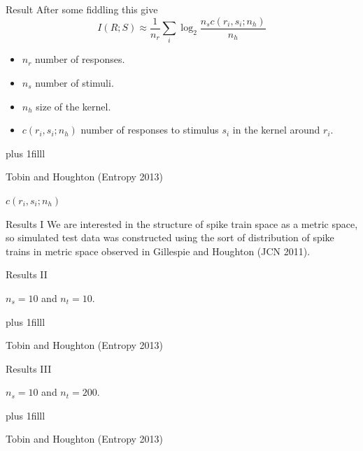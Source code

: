 \documentclass{beamer}
\newcommand{\btVFill}{\vskip0pt plus 1filll}
\begin{document}
\begin{frame}{Result}
After some fiddling this give
\color{dark}
$$
 I(R;S) \approx \frac{1}{n_r}\sum_{i} \log_2{\frac{n_sc(r_i,s_i;n_h)}{n_h}}
$$
\color{black}
\begin{itemize}
\item \color{dark}$n_r$\color{black}{} number of responses.
\item \color{dark}$n_s$\color{black}{} number of stimuli.
\item \color{dark}$n_h$\color{black}{} size of the kernel.
\item \color{dark}$c(r_i,s_i;n_h)$\color{black}{} number of responses to stimulus \color{dark}$s_i$\color{black}{} in the kernel around \color{dark}$r_i$\color{black}.
\end{itemize}
\btVFill
\begin{flushright}
\tiny{Tobin and Houghton (Entropy 2013)}
\end{flushright}
\end{frame}

\begin{frame}{$c(r_i,s_i;n_h)$}
\color{reddish}
\begin{center}

\end{center}
\color{black}
\end{frame}

\begin{frame}{Results I}
We are interested in the structure of spike train space as a metric
space, so simulated test data was constructed using the sort of
distribution of spike trains in metric space observed in Gillespie and
Houghton (JCN 2011).
\end{frame}

\begin{frame}{Results II}
\color{reddish}
\begin{center}

\color{black}
\color{dark} $n_s=10$\color{black}{} and \color{dark}{} $n_t=10$\color{black}.
\end{center}
\color{black}
\btVFill
\begin{flushright}
\tiny{Tobin and Houghton (Entropy 2013)}
\end{flushright}
\end{frame}


\begin{frame}{Results III}
\color{reddish}
\begin{center}

\color{black}
\color{dark} $n_s=10$\color{black}{} and \color{dark}{} $n_t=200$\color{black}.
\end{center}
\color{black}
\btVFill
\begin{flushright}
\tiny{Tobin and Houghton (Entropy 2013)}
\end{flushright}
\end{frame}
\end{document}
